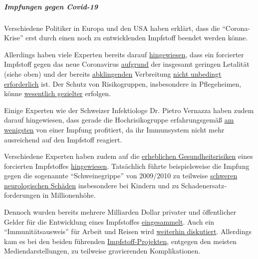 \hypertarget{impfungen-gegen-covid-19}{%
\subparagraph{\texorpdfstring{\textbf{Impfungen gegen
Covid-19}}{Impfungen gegen Covid-19}}\label{impfungen-gegen-covid-19}}

Verschiedene Politiker in Europa und den USA haben erklärt, dass die
``Corona-Krise'' erst durch einen noch zu entwicklenden Impfstoff
beendet werden könne.

Allerdings haben viele Experten bereits darauf
\href{https://www.nature.com/articles/d41586-020-00751-9}{hingewiesen},
dass ein forcierter Impfstoff gegen das neue Coronavirus
\href{https://www.youtube.com/watch?v=vrL9QKGQrWk}{aufgrund} der
insgesamt geringen Letalität (siehe oben) und der bereits
\href{https://www.bitchute.com/video/DXxeej9CW1pz/}{abklingenden}
Verbreitung
\href{https://www.news.com.au/lifestyle/health/health-problems/no-vaccine-for-coronavirus-a-possibility/news-story/34e678ae205b50ea983cc64ab2943608}{nicht
unbedingt erforderlich} ist. Der Schutz von Risikogruppen, insbesondere
in Pflegeheimen, könne
\href{https://www.reuters.com/article/us-health-coronavirus-haseltine-newsmake-idUSKBN22W34T}{wesentlich
gezielter} erfolgen.

Einige Experten wie der Schweizer Infektiologe Dr. Pietro Vernazza haben
zudem darauf hingewiesen, dass gerade die Hochrisikogruppe
erfahrungsgemäß
\href{https://infekt.ch/2020/05/corona-impfung-als-ultimative-rettung/}{am
wenigsten} von einer Impfung profitiert, da ihr Immunsystem nicht mehr
ausreichend auf den Impfstoff reagiert.

Verschiedene Experten haben zudem auf die
\href{https://www.reuters.com/article/us-health-coronavirus-vaccines-insight-idUSKBN20Y1GZ}{erheblichen
Gesundheitsrisiken} eines forcierten Impfstoffes
\href{https://www.nature.com/articles/d41586-020-00751-9}{hingewiesen}.
Tatsächlich führte beispielsweise die Impfung gegen die sogenannte
``Schweinegrippe'' von 2009/2010 zu teilweise
\href{https://www.ibtimes.co.uk/brain-damaged-uk-victims-swine-flu-vaccine-get-60-million-compensation-1438572}{schweren
neurologischen Schäden} insbesondere bei Kindern und zu
Schaden­­ersatz­forderungen in Millionenhöhe.

Dennoch wurden bereits mehrere Milliarden Dollar privater und
öffentlicher Gelder für die Entwicklung eines Impfstoffes
\href{https://www.nytimes.com/2020/05/04/world/europe/eu-coronavirus-vaccine.html}{eingesammelt}.
Auch ein ``Immunitätsausweis'' für Arbeit und Reisen wird
\href{https://www.theguardian.com/politics/2020/may/03/coronavirus-health-passports-for-uk-possible-in-months}{weiterhin
diskutiert}. Allerdings kam es bei den beiden führenden
\href{https://www.thelancet.com/journals/lancet/article/PIIS0140-6736(20)31252-6/fulltext}{Impfstoff-Projekten},
entgegen den meisten Mediendarstellungen, zu teilweise gravierenden
Komplikationen.


